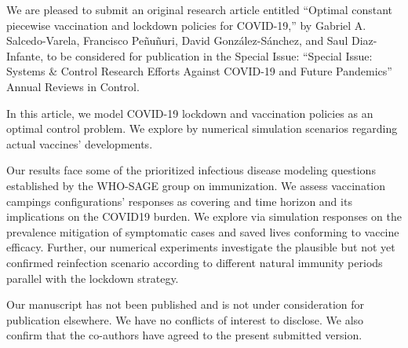 \documentclass[10pt ,stdletter, dateno, sigleft]{newlfm}
\begin{document}
    \begin{newlfm}
             We are pleased to submit an original research article entitled
        ``Optimal constant piecewise vaccination and lockdown
        policies for COVID-19,''  by Gabriel A. Salcedo-Varela, Francisco Pe\~nu\~nuri, David Gonz\'alez-S\'anchez, and Saul Diaz-Infante, to be considered for publication in the Special Issue: 
        ``Special Issue: Systems \& Control Research Efforts Against COVID-19 and Future Pandemics'' Annual Reviews in Control.

            In this article, we model COVID-19 lockdown and vaccination 
            policies as an  optimal control problem. We explore by numerical 
            simulation scenarios regarding actual vaccines' developments. 

        Our results face some of the prioritized infectious disease modeling 
        questions established by the WHO-SAGE group on immunization. We assess 
        vaccination campings configurations' responses as covering and time 
        horizon and its implications on the COVID19 burden. We explore via 
        simulation responses on the prevalence mitigation of symptomatic cases 
        and saved lives conforming to vaccine efficacy. Further, our numerical 
        experiments investigate the plausible but not yet confirmed 
        reinfection scenario according to different natural immunity periods parallel with the lockdown strategy.  
        
            Our manuscript has not been published and is not under 
        consideration for publication elsewhere. We have no conflicts of interest to disclose.
        We also confirm that the co-authors have agreed to the present 
        submitted version.
        \\[0.5cm]
\end{newlfm}
\end{document}
